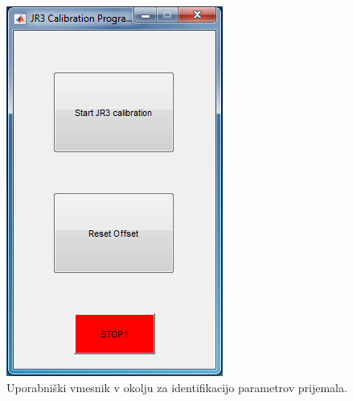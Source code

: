 \begin{figure}
	\centering
	\includegraphics[scale=1]{./Slike/jr3_calibration.png}
	\caption{Uporabni\v{s}ki vmesnik v okolju \matlab za identifikacijo parametrov prijemala.}
	\label{fig:jr3_calibration}
\end{figure}
